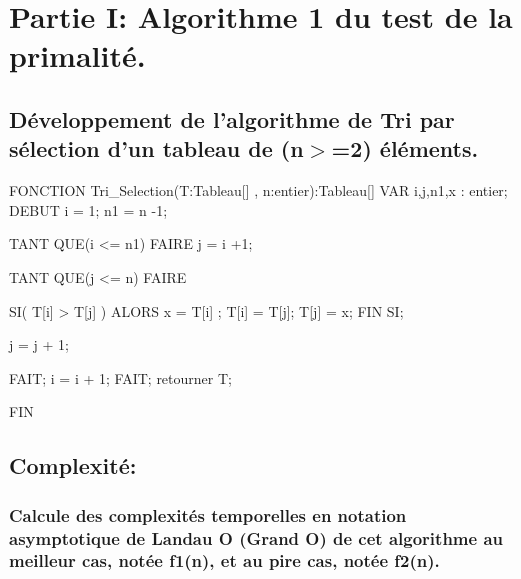 \documentclass[12pt]{article}
\begin{document}
\def\reportnumber{3}
\def\reporttitle{Algorithmes de Complexité temporelle quadratique O(n²)}


\section{Partie I: Algorithme 1 du test de la primalité.}

\subsection{Développement de l'algorithme de Tri par sélection d'un tableau de (n$>$=2) éléments. }

\begin{sql}

 FONCTION Tri_Selection(T:Tableau[] , n:entier):Tableau[]
VAR
	i,j,n1,x : entier;
DEBUT
	i = 1;
	n1 = n -1;
	
	TANT QUE(i <= n1)
	FAIRE
		j = i +1;
		
		TANT QUE(j <= n)
		FAIRE
			
			SI( T[i] > T[j] )
			ALORS
				x = T[i] ;
				T[i] = T[j];
				T[j] = x;
			FIN SI;
			
			j = j + 1;
			
		FAIT;
		i = i + 1;	
	FAIT;
	retourner T;

FIN
 
\end{sql}

\subsection{Complexité:}

\subsubsection{Calcule des complexités temporelles en notation asymptotique de Landau O (Grand O) de  cet  algorithme au meilleur cas, notée f1(n), et au pire cas, notée f2(n). }
\end{document}

